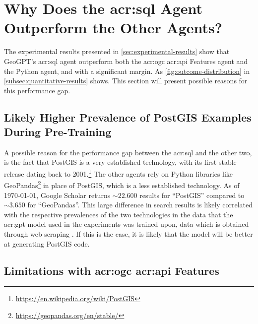\section[Why Does the SQL Agent Outperform the Other Agents?]{Why Does the \acrshort{acr:sql} Agent Outperform the Other Agents?}
\label{sec:why-sql-better}

The experimental results presented in \autoref{sec:experimental-results} show that GeoGPT's \acrshort{acr:sql} agent outperform both the \acrshort{acr:ogc} \acrshort{acr:api} Features agent and the Python agent, and with a significant margin. As \autoref{fig:outcome-distribution} in \autoref{subsec:quantitative-results} shows. This section will present possible reasons for this performance gap.

\subsection{Likely Higher Prevalence of PostGIS Examples During Pre-Training}

A possible reason for the performance gap between the \acrshort{acr:sql} and the other two, is the fact that PostGIS is a very established technology, with its first stable release dating back to 2001.\footnote{\url{https://en.wikipedia.org/wiki/PostGIS}} The other agents rely on Python libraries like GeoPandas\footnote{\url{https://geopandas.org/en/stable/}} in place of PostGIS, which is a less established technology. As of \today, Google Scholar returns $\sim 22.600$ results for \enquote{PostGIS} compared to  $\sim 3.650$ for \enquote{GeoPandas}. This large difference in search results is likely correlated with the respective prevalences of the two technologies in the data that the \acrshort{acr:gpt} model used in the experiments was trained upon, data which is obtained through web scraping \citep[3]{radfordLanguageModelsAre2019}. If this is the case, it is likely that the model will be better at generating PostGIS code.

\subsection[Limitations with OGC API Features]{Limitations with \acrshort{acr:ogc} \acrshort{acr:api} Features}
\label{subsec:difficulties-with-oaf}

